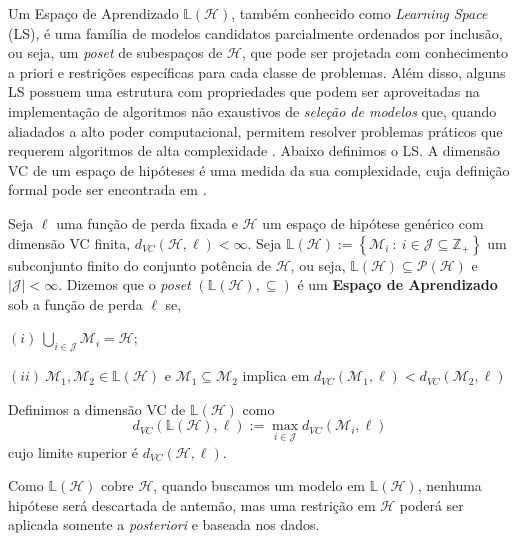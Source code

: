 Um Espaço de Aprendizado $\mathbb{L} \left( \mathcal{H} \right)$, também conhecido como \textit{Learning Space} (LS), é uma família de modelos candidatos parcialmente ordenados por inclusão, ou seja, um \textit{poset} de subespaços de $\mathcal{H}$, que pode ser projetada com conhecimento a priori e restrições específicas para cada classe de problemas. Além disso, alguns LS possuem uma estrutura com propriedades que podem ser aproveitadas na implementação de algoritmos não exaustivos de \textit{seleção de modelos} que, quando aliadados a alto poder computacional, permitem resolver problemas práticos que requerem algoritmos de alta complexidade \cite{DIEGO:01}. Abaixo definimos o LS. A dimensão VC de um espaço de hipóteses é uma medida da sua complexidade, cuja definição formal pode ser encontrada em \cite{DIEGO:01}.

\begin{definition} 
        Seja $\ell$ uma função de perda fixada e $\mathcal{H}$ um espaço de hipótese genérico com dimensão VC finita, $d_{VC} \left( \mathcal{H},\ell \right) < \infty	$. Seja $\mathbb{L} \left( \mathcal{H} \right):= \left\{ \mathcal{M}_{i} \ : \ i \in \mathcal{J} \subseteq \mathbb{Z}_{+}  \right\} $ um subconjunto finito do conjunto potência de $\mathcal{H}$, ou seja, $\mathbb{L} \left( \mathcal{H} \right) \subseteq \mathcal{P} \left( \mathcal{H} \right)$ e $ \left| \mathcal{J} \right| < \infty$. Dizemos que o \textit{poset} $ \left( \mathbb{L} \left( \mathcal{H} \right), \subseteq  \right)$ é um \textbf{Espaço de Aprendizado} sob a função de perda $\ell$ se,
        
        $ \left( i \right) \: \bigcup_{i \in \mathcal{J}} \mathcal{M}_{i} = \mathcal{H}$;
        
        $ \left( ii \right) \: \mathcal{M}_{1} , \mathcal{M}_{2} \in \mathbb{L} \left( \mathcal{H} \right) $ e $  \mathcal{M}_{1} \subseteq  \mathcal{M}_{2}$ implica em $d_{VC} \left( \mathcal{M}_{1},\ell \right) < d_{VC} \left( \mathcal{M}_{2},\ell \right) $

        Definimos a dimensão VC de $ \mathbb{L} \left( \mathcal{H} \right)$ como
        $$d_{VC} \left( \mathbb{L} \left( \mathcal{H} \right),\ell \right) := \max_{i \in \mathcal{J}}d_{VC} \left( \mathcal{M}_{i},\ell \right) $$
        cujo limite superior é $d_{VC} \left( \mathcal{H},\ell \right)$.
        \label{def:ls}
\end{definition}

Como $\mathbb{L} \left( \mathcal{H} \right)$ cobre $ \mathcal{H} $, quando buscamos um modelo em $\mathbb{L} \left( \mathcal{H} \right)$, nenhuma hipótese será descartada de antemão, mas uma restrição em $\mathcal{H}$ poderá ser aplicada somente a \textit{posteriori} e baseada nos dados.

